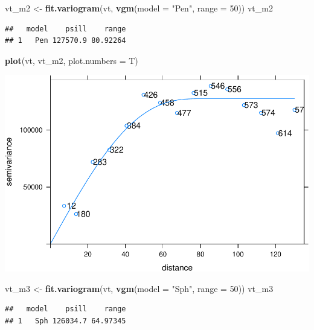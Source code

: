 \documentclass[11pt,]{article}
\newenvironment{Shaded}{\begin{snugshade}}{\end{snugshade}}
\newcommand{\KeywordTok}[1]{\textcolor[rgb]{0.13,0.29,0.53}{\textbf{#1}}}
\newcommand{\DataTypeTok}[1]{\textcolor[rgb]{0.13,0.29,0.53}{#1}}
\newcommand{\DecValTok}[1]{\textcolor[rgb]{0.00,0.00,0.81}{#1}}
\newcommand{\StringTok}[1]{\textcolor[rgb]{0.31,0.60,0.02}{#1}}
\newcommand{\NormalTok}[1]{#1}
\begin{document}
\begin{Shaded}
\begin{Highlighting}[]
\NormalTok{vt_m2 <-}\StringTok{ }\KeywordTok{fit.variogram}\NormalTok{(vt, }\KeywordTok{vgm}\NormalTok{(}\DataTypeTok{model =} \StringTok{"Pen"}\NormalTok{, }\DataTypeTok{range =} \DecValTok{50}\NormalTok{))}
\NormalTok{vt_m2}
\end{Highlighting}
\end{Shaded}

\begin{verbatim}
##   model    psill    range
## 1   Pen 127570.9 80.92264
\end{verbatim}

\begin{Shaded}
\begin{Highlighting}[]
\KeywordTok{plot}\NormalTok{(vt, vt_m2, }\DataTypeTok{plot.numbers =}\NormalTok{ T)}
\end{Highlighting}
\end{Shaded}

\includegraphics{proyecto_files/figure-latex/unnamed-chunk-55-3.pdf}

\begin{Shaded}
\begin{Highlighting}[]
\NormalTok{vt_m3 <-}\StringTok{ }\KeywordTok{fit.variogram}\NormalTok{(vt, }\KeywordTok{vgm}\NormalTok{(}\DataTypeTok{model =} \StringTok{"Sph"}\NormalTok{, }\DataTypeTok{range =} \DecValTok{50}\NormalTok{))}
\NormalTok{vt_m3}
\end{Highlighting}
\end{Shaded}

\begin{verbatim}
##   model    psill    range
## 1   Sph 126034.7 64.97345
\end{verbatim}
\end{document}
